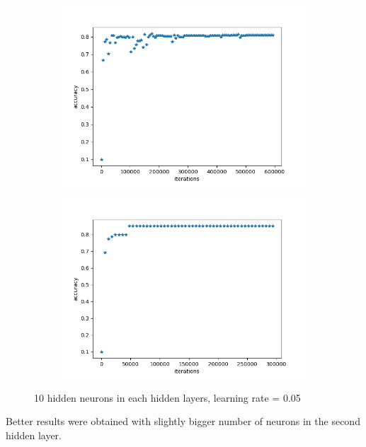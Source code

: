 \begin{figure}[H]
\centering
\begin{subfigure}[b]{.45\linewidth}
\includegraphics[width=\linewidth]{img/tests/lwf/40ppl/h2/PCA_MLP15_10_10.png}
\end{subfigure}
\begin{subfigure}[b]{.45\linewidth}
\includegraphics[width=\linewidth]{img/tests/lwf/40ppl/h2/PCA_MLP15_10_101.png}
\end{subfigure}
\caption{10 hidden neurons in each hidden layers, learning rate = 0.05}
\end{figure}


Better results were obtained with slightly bigger number of neurons in the second hidden layer. 


